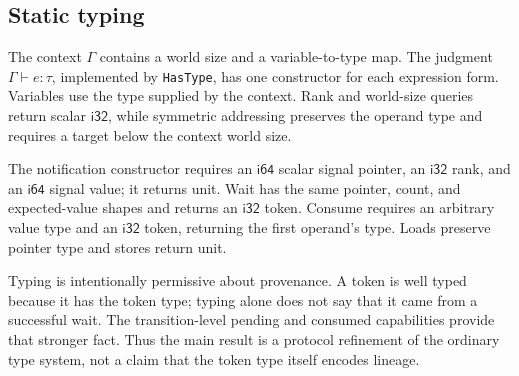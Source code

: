 \documentclass[a4paper,USenglish]{lipics-v2021}
\begin{document}
\subsection{Static typing}
The context \(\Gamma\) contains a world size and a variable-to-type map. The
judgment \(\Gamma\vdash e:\tau\), implemented by \texttt{HasType}, has one
constructor for each expression form. Variables use the type supplied by the
context. Rank and world-size queries return scalar \(\mathsf{i32}\), while
symmetric addressing preserves the operand type and requires a target below
the context world size.

The notification constructor requires an \(\mathsf{i64}\) scalar signal
pointer, an \(\mathsf{i32}\) rank, and an \(\mathsf{i64}\) signal value; it
returns unit. Wait has the same pointer, count, and expected-value shapes and
returns an \(\mathsf{i32}\) token. Consume requires an arbitrary value type
and an \(\mathsf{i32}\) token, returning the first operand's type. Loads
preserve pointer type and stores return unit.

Typing is intentionally permissive about provenance. A token is well typed
because it has the token type; typing alone does not say that it came from a
successful wait. The transition-level pending and consumed capabilities provide
that stronger fact. Thus the main result is a protocol refinement of the
ordinary type system, not a claim that the token type itself encodes lineage.
\end{document}
